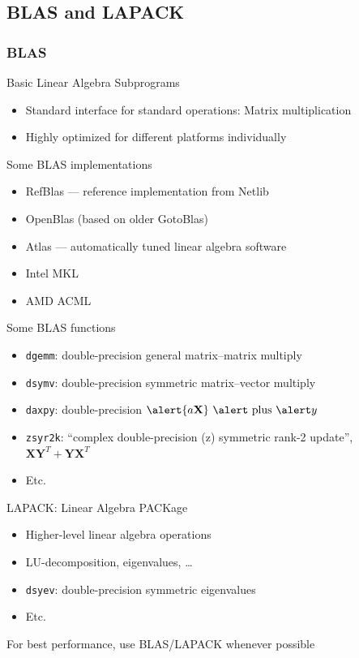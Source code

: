 \documentclass[usenames,dvipsnames,mathserif,compress]{beamer}
\begin{document}
\subsection*{BLAS and LAPACK}

\begin{frame}
  \frametitle{BLAS}
  \begin{block}{Basic Linear Algebra Subprograms}
  \end{block}
  \begin{itemize}
  \item Standard interface for standard operations:
    Matrix multiplication
  \item Highly optimized for different platforms individually
  \end{itemize}
  \begin{block}{Some BLAS implementations}
    \begin{itemize}
    \item RefBlas --- reference implementation from Netlib
    \item OpenBlas (based on older GotoBlas)
    \item Atlas --- automatically tuned linear algebra software
    \item Intel MKL
    \item AMD ACML
    \end{itemize}
  \end{block}
\end{frame}

\begin{frame}
  \begin{block}{Some BLAS functions}
    \begin{itemize}
    \item \texttt{dgemm}: \alert double-precision \alert{ge}neral \alert matrix--\alert matrix multiply
    \item \texttt{dsymv}: \alert double-precision \alert{sy}mmetric \alert matrix--\alert vector multiply
    \item \texttt{daxpy}: \alert double-precision $\alert{a \mathbf X}\textrm{ \alert plus } \alert y$
    \item \texttt{zsyr2k}: ``complex double-precision (\alert z) \alert{sy}mmetric \alert ran\alert{k-2} update'',
      $\mathbf X \mathbf Y^T + \mathbf Y \mathbf X^T$
    \item Etc.
    \end{itemize}
  \end{block}
  \begin{block}{LAPACK: Linear Algebra PACKage}
    \begin{itemize}
    \item Higher-level linear algebra operations
    \item LU-decomposition, eigenvalues, \ldots
    \item \texttt{dsyev}: \alert double-precision \alert{sy}mmetric \alert eigen{\alert v}alues
    \item Etc.
    \end{itemize}
  \end{block}
  For best performance, use BLAS/LAPACK whenever possible
\end{frame}
\end{document}
